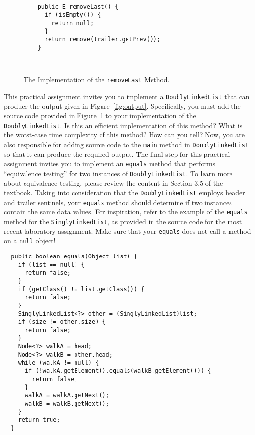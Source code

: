 \documentclass[11pt]{article}
\newcommand{\mainprogram}{\lstinline{DoublyLinkedList}}
\newcommand{\program}[1]{\lstinline{#1}}
\begin{document}
\begin{figure}[t]
  \centering
  \begin{verbatim}

    public E removeLast() {
      if (isEmpty()) {
        return null;
      }
      return remove(trailer.getPrev());
    }

  \end{verbatim}

  \vspace*{-.6in}
  \caption{The Implementation of the \program{removeLast} Method.}~\label{fig:code}
  \vspace*{-.25in}
\end{figure}

This practical assignment invites you to implement a \mainprogram{} that can
produce the output given in Figure~\ref{fig:output}. Specifically, you must add
the source code provided in Figure~\ref{fig:code} to your implementation of the
\mainprogram{}. Is this an efficient implementation of this method? What is the
worst-case time complexity of this method? How can you tell? Now, you are also
responsible for adding source code to the \program{main} method in
\mainprogram{} so that it can produce the required output. The final step for
this practical assignment invites you to implement an \program{equals} method
that performs ``equivalence testing'' for two instances of \mainprogram{}. To
learn more about equivalence testing, please review the content in Section 3.5
of the textbook. Taking into consideration that the \mainprogram{} employs
header and trailer sentinels, your \program{equals} method should determine if
two instances contain the same data values. For inspiration, refer to the
example of the \program{equals} method for the \program{SinglyLinkedList}, as
provided in the source code for the most recent laboratory assignment. Make sure
that your \program{equals} does not call a method on a \program{null} object!

\begin{verbatim}
  public boolean equals(Object list) {
    if (list == null) {
      return false;
    }
    if (getClass() != list.getClass()) {
      return false;
    }
    SinglyLinkedList<?> other = (SinglyLinkedList)list;
    if (size != other.size) {
      return false;
    }
    Node<?> walkA = head;
    Node<?> walkB = other.head;
    while (walkA != null) {
      if (!walkA.getElement().equals(walkB.getElement())) {
        return false;
      }
      walkA = walkA.getNext();
      walkB = walkB.getNext();
    }
    return true;
  }
\end{verbatim}
\end{document}
